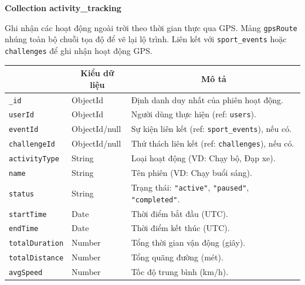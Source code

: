 \textbf{Collection activity\_tracking}
\label{subsec:col_activity_tracking}

Ghi nhận các hoạt động ngoài trời theo thời gian thực qua GPS. Mảng \texttt{gpsRoute} nhúng toàn bộ chuỗi tọa độ để vẽ lại lộ trình. Liên kết với \texttt{sport\_events} hoặc \texttt{challenges} để ghi nhận hoạt động GPS.

\begin{table}[H]
\centering
\footnotesize
\setlength{\tabcolsep}{5pt}
\renewcommand{\arraystretch}{1.15}
\begin{tabularx}{\textwidth}{|p{3.6cm}|p{2.6cm}|X|}
\hline
\rowcolor{dbheadblue}
\multicolumn{1}{|c|}{\color{white}\textbf{Trường}} &
\multicolumn{1}{c|}{\color{white}\textbf{Kiểu dữ liệu}} &
\multicolumn{1}{c|}{\color{white}\textbf{Mô tả}} \\
\hline
\texttt{\_id}            & ObjectId      & Định danh duy nhất của phiên hoạt động. \\ \hline
\rowcolor{dbrowalt}
\texttt{userId}         & ObjectId      & Người dùng thực hiện (ref: \texttt{users}). \\ \hline
\texttt{eventId}        & ObjectId/null & Sự kiện liên kết (ref: \texttt{sport\_events}), nếu có. \\ \hline
\rowcolor{dbrowalt}
\texttt{challengeId}    & ObjectId/null & Thử thách liên kết (ref: \texttt{challenges}), nếu có. \\ \hline
\texttt{activityType}   & String        & Loại hoạt động (VD: Chạy bộ, Đạp xe). \\ \hline
\rowcolor{dbrowalt}
\texttt{name}           & String        & Tên phiên (VD: Chạy buổi sáng). \\ \hline
\texttt{status}         & String        & Trạng thái: \texttt{"active"}, \texttt{"paused"}, \texttt{"completed"}. \\ \hline
\rowcolor{dbrowalt}
\texttt{startTime}      & Date          & Thời điểm bắt đầu (UTC). \\ \hline
\texttt{endTime}        & Date          & Thời điểm kết thúc (UTC). \\ \hline
\rowcolor{dbrowalt}
\texttt{totalDuration}  & Number        & Tổng thời gian vận động (giây). \\ \hline
\texttt{totalDistance}  & Number        & Tổng quãng đường (mét). \\ \hline
\rowcolor{dbrowalt}
\texttt{avgSpeed}       & Number        & Tốc độ trung bình (km/h). \\ \hline

\end{tabularx}
\end{table}
